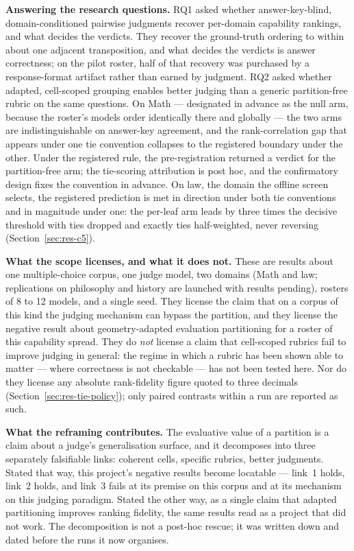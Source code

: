 \textbf{Answering the research questions.}
RQ1 asked whether answer-key-blind, domain-conditioned pairwise
judgments recover per-domain capability rankings, and what decides the
verdicts. They recover the ground-truth ordering to within about one
adjacent transposition, and what decides the verdicts is answer
correctness; on the pilot roster, half of that recovery was purchased
by a response-format artifact rather than earned by judgment.
RQ2 asked whether adapted, cell-scoped grouping enables better judging
than a generic partition-free rubric on the same questions. On Math ---
designated in advance as the null arm, because the roster's models
order identically there and globally --- the two arms are
indistinguishable on answer-key agreement, and the rank-correlation gap
that appears under one tie convention collapses to the registered
boundary under the other. Under the registered rule, the
pre-registration returned a verdict for the partition-free arm; the
tie-scoring attribution is post hoc, and the confirmatory design fixes
the convention in advance. On law, the domain the offline screen
selects, the registered prediction is met in direction under both tie
conventions and in magnitude under one: the per-leaf arm leads by
three times the decisive threshold with ties dropped and exactly ties
half-weighted, never reversing (Section~\ref{sec:res-c5}).

\textbf{What the scope licenses, and what it does not.}
These are results about one multiple-choice corpus, one judge model,
two domains (Math and law; replications on philosophy and history are
launched with results pending), rosters of 8 to 12 models, and a
single seed. They
license the claim that on a corpus of this kind the judging mechanism
can bypass the partition, and they license the negative result about
geometry-adapted evaluation partitioning for a roster of this
capability spread. They do \emph{not} license a claim that cell-scoped
rubrics fail to improve judging in general: the regime in which a
rubric has been shown able to matter --- where correctness is not
checkable --- has not been tested here. Nor do they license any
absolute rank-fidelity figure quoted to three decimals
(Section~\ref{sec:res-tie-policy}); only paired contrasts within a run
are reported as such.

\textbf{What the reframing contributes.}
The evaluative value of a partition is a claim about a judge's
generalisation surface, and it decomposes into three separately
falsifiable links: coherent cells, specific rubrics, better judgments.
Stated that way, this project's negative results become locatable ---
link~1 holds, link~2 holds, and link~3 fails at its premise on this
corpus and at its mechanism on this judging paradigm. Stated the other
way, as a single claim that adapted partitioning improves ranking
fidelity, the same results read as a project that did not work. The
decomposition is not a post-hoc rescue; it was written down and dated
before the runs it now organises.

